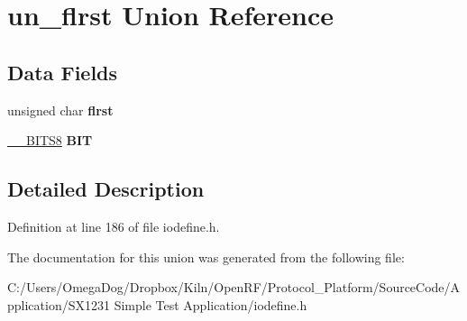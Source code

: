 \hypertarget{unionun__flrst}{\section{un\-\_\-flrst Union Reference}
\label{unionun__flrst}
}
\subsection*{Data Fields}
\begin{DoxyCompactItemize}
\item 
\hypertarget{unionun__flrst_a889108e4cc210af698730f4ed30114e2}{unsigned char {\bfseries flrst}}\label{unionun__flrst_a889108e4cc210af698730f4ed30114e2}

\item 
\hypertarget{unionun__flrst_a82a458997136c685062ad03b8fc96c30}{\hyperlink{struct_____b_i_t_s8}{\-\_\-\-\_\-\-B\-I\-T\-S8} {\bfseries B\-I\-T}}\label{unionun__flrst_a82a458997136c685062ad03b8fc96c30}

\end{DoxyCompactItemize}


\subsection{Detailed Description}


Definition at line 186 of file iodefine.\-h.



The documentation for this union was generated from the following file\-:\begin{DoxyCompactItemize}
\item 
C\-:/\-Users/\-Omega\-Dog/\-Dropbox/\-Kiln/\-Open\-R\-F/\-Protocol\-\_\-\-Platform/\-Source\-Code/\-Application/\-S\-X1231 Simple Test Application/iodefine.\-h\end{DoxyCompactItemize}
